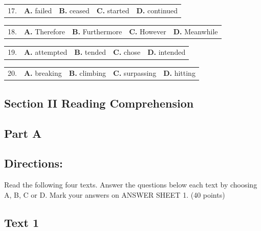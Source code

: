 \documentclass[UTF8,11pt]{ctexart}
\begin{document}
\noindent\begin{tabularx}{\linewidth}{@{}lXXXX@{}}17. & \textbf{A.} failed & \textbf{B.} ceased & \textbf{C.} started & \textbf{D.} continued\\\end{tabularx}\par

\noindent\begin{tabularx}{\linewidth}{@{}lXXXX@{}}18. & \textbf{A.} Therefore & \textbf{B.} Furthermore & \textbf{C.} However & \textbf{D.} Meanwhile\\\end{tabularx}\par

\noindent\begin{tabularx}{\linewidth}{@{}lXXXX@{}}19. & \textbf{A.} attempted & \textbf{B.} tended & \textbf{C.} chose & \textbf{D.} intended\\\end{tabularx}\par

\noindent\begin{tabularx}{\linewidth}{@{}lXXXX@{}}20. & \textbf{A.} breaking & \textbf{B.} climbing & \textbf{C.} surpassing & \textbf{D.} hitting\\\end{tabularx}\par

\subsection*{\textbf{Section II Reading Comprehension}}


\subsection*{\textbf{Part A}}


\subsection*{\textbf{Directions:}}


Read the following four texts. Answer the questions below each text by choosing A, B, C or D. Mark your answers on ANSWER SHEET 1. (40 points)


\subsection*{\textbf{Text 1}}
\end{document}
